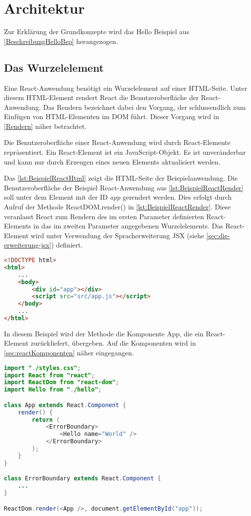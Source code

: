 \section{Architektur}
Zur Erklärung der Grundkonzepte wird das Hello Beispiel aus \autoref{BeschreibungHelloBsp} herangezogen.

\subsection{Das Wurzelelement}\label{sec:rWurz}

Eine React-Anwendung benötigt ein Wurzelelement auf einer HTML-Seite. Unter diesem HTML-Element rendert React die Benutzeroberfläche der React-Anwendung. Das Rendern bezeichnet dabei den Vorgang, der schlussendlich zum Einfügen von HTML-Elementen im DOM führt. Dieser Vorgang wird in \autoref{Rendern} näher betrachtet. 

Die Benutzeroberfläche einer React-Anwendung wird durch React-Elemente repräsentiert. Ein React-Element ist ein JavaScript-Objekt. Es ist unveränderbar und kann nur durch Erzeugen eines neuen Elements aktualisiert werden.

Das \autoref{lst:BeispielReactHtml} zeigt die HTML-Seite der Beispielanwendung. Die Benutzeroberfläche der Beispiel React-Anwendung aus \autoref{lst:BeispielReactRender} soll unter dem Element mit der ID \textit{app} gerendert werden. Dies erfolgt durch Aufruf der Methode \glqq ReactDOM.render() \grqq in \autoref{lst:BeispielReactRender}. Diese veranlasst React zum Rendern des im ersten Parameter definierten React-Elements in das im zweiten Parameter angegebenen Wurzelelements. Das React-Element wird unter Verwendung der Spracherweiterung JSX (siehe \autoref{sec:die-erweiterung-jsx}) definiert.

\begin{lstlisting}[caption=Beispiel React-Anwendung: HTML-Datei , label=lst:BeispielReactHtml, language=HTML]
<!DOCTYPE html>
<html>
	...
	<body>
		<div id="app"></div>
		<script src="src/app.js"></script>
	</body>
	...
</html>
\end{lstlisting}

In diesem Beispiel wird der Methode die Komponente App, die ein React-Element zurückliefert, übergeben. Auf die Komponenten wird in \autoref{sec:reactKomponenten} näher eingegangen. \autocites[vgl.][4\psqq, 26\psqq]{Zeigermann.2016}[vgl.][]{Facebook.2018}[vgl.][]{Facebook.2018c}[vgl.][2\psqq]{Stefanov.2017}


\begin{lstlisting}[caption=Beispiel React-Anwendung: Aufruf der Render-Methode, label=lst:BeispielReactRender, language=Java]
import "./styles.css";
import React from "react";
import ReactDom from "react-dom";
import Hello from "./hello";

class App extends React.Component {
	render() {	
		return (
			<ErrorBoundary>
				<Hello name="World" />
			</ErrorBoundary>
		);
	}
}

class ErrorBoundary extends React.Component {
	...	
}

ReactDom.render(<App />, document.getElementById("app"));
\end{lstlisting}


